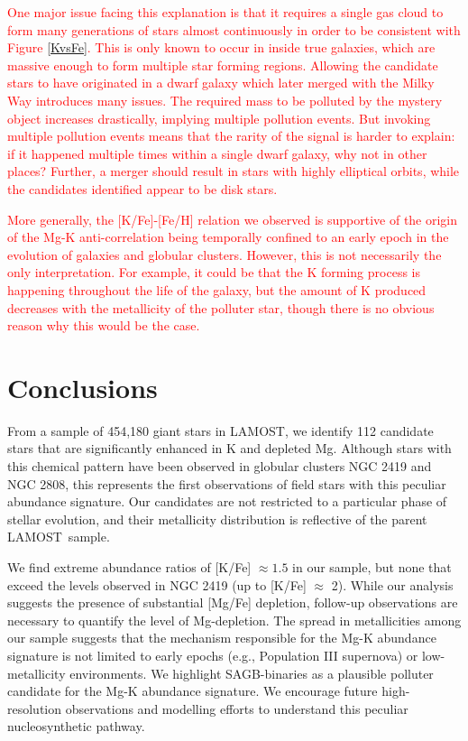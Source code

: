 \documentclass[a4paper,fleqn,usenatbib]{mnras}
\newcommand{\todo}[1]{\textcolor{red}{#1}}
\newcommand{\project}[1]{#1}
\newcommand{\lamost}{\project{LAMOST}}
\begin{document}
\todo{One major issue facing this explanation is that it requires a single gas cloud to form many generations of stars almost continuously in order to be consistent with Figure \ref{KvsFe}. This is only known to occur in inside true galaxies, which are massive enough to form multiple star forming regions. Allowing the candidate stars to have originated in a dwarf galaxy which later merged with the Milky Way introduces many issues. The required mass to be polluted by the mystery object increases drastically, implying multiple pollution events. But invoking multiple pollution events means that the rarity of the signal is harder to explain: if it happened multiple times within a single dwarf galaxy, why not in other places? Further, a merger should result in stars with highly elliptical orbits, while the candidates identified appear to be disk stars.}

\todo{More generally, the [K/Fe]-[Fe/H] relation we observed is supportive of the origin of the Mg-K anti-correlation being temporally confined to an early epoch in the evolution of galaxies and globular clusters. However, this is not necessarily the only interpretation. For example, it could be that the K forming process is happening throughout the life of the galaxy, but the amount of K produced decreases with the metallicity of the polluter star, though there is no obvious reason why this would be the case.}



\section{Conclusions}
\label{sec:conclusion}
From a sample of 454,180 giant stars in \lamost, we identify 112 candidate stars that are significantly enhanced in K and depleted Mg. Although stars with this chemical pattern have been observed in globular clusters NGC 2419 and NGC 2808, this represents the first observations of field stars with this peculiar abundance signature. Our candidates are not restricted to a particular phase of stellar evolution, and their metallicity distribution is reflective of the parent \lamost\ sample.

We find extreme abundance ratios of [K/Fe] $\approx 1.5$ in our sample, but none that exceed the levels observed in NGC 2419 (up to [K/Fe] $\approx$ 2). While our analysis suggests the presence of substantial [Mg/Fe] depletion, follow-up observations are necessary to quantify the level of Mg-depletion. The spread in metallicities among our sample suggests that the mechanism responsible for the Mg-K abundance signature is not limited to early epochs (e.g., Population III supernova) or low-metallicity environments. We highlight SAGB-binaries as a plausible polluter candidate for the Mg-K abundance signature. We encourage future high-resolution observations and modelling efforts to understand this peculiar nucleosynthetic pathway.
\end{document}
